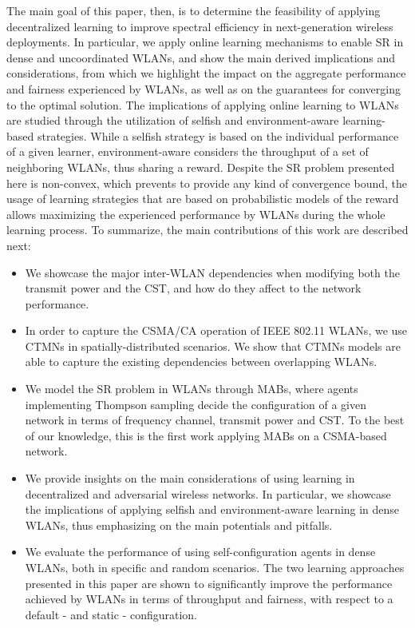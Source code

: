 \documentclass[preprint,12pt]{elsarticle}
\begin{document}
The main goal of this paper, then, is to determine the feasibility of applying decentralized learning to improve spectral efficiency in next-generation wireless deployments. In particular, we apply online learning mechanisms to enable SR in dense and uncoordinated WLANs, and show the main derived implications and considerations, from which we highlight the impact on the aggregate performance and fairness experienced by WLANs, as well as on the guarantees for converging to the optimal solution. The implications of applying online learning to WLANs are studied through the utilization of selfish and environment-aware learning-based strategies. While a selfish strategy is based on the individual performance of a given learner, environment-aware considers the throughput of a set of neighboring WLANs, thus sharing a reward. Despite the SR problem presented here is non-convex, which prevents to provide any kind of convergence bound, the usage of learning strategies that are based on probabilistic models of the reward allows maximizing the experienced performance by WLANs during the whole learning process. To summarize, the main contributions of this work are described next:
\begin{itemize}
	\item We showcase the major inter-WLAN dependencies when modifying both the transmit power and the CST, and how do they affect to the network performance.
	\item In order to capture the CSMA/CA operation of IEEE 802.11 WLANs, we use CTMNs \cite{bellalta2017throughput} in spatially-distributed scenarios. We show that CTMNs models are able to capture the existing dependencies between overlapping WLANs. 	
	\item We model the SR problem in WLANs through MABs, where agents implementing Thompson sampling decide the configuration of a given network in terms of frequency channel, transmit power and CST. To the best of our knowledge, this is the first work applying MABs on a CSMA-based network.
	\item We provide insights on the main considerations of using learning in decentralized and adversarial wireless networks. In particular, we showcase the implications of applying selfish and environment-aware learning in dense WLANs, thus emphasizing on the main potentials and pitfalls.
	\item We evaluate the performance of using self-configuration agents in dense WLANs, both in specific and random scenarios. The two learning approaches presented in this paper are shown to significantly improve the performance achieved by WLANs in terms of throughput and fairness, with respect to a default - and static - configuration.
\end{itemize}		
\end{document}
